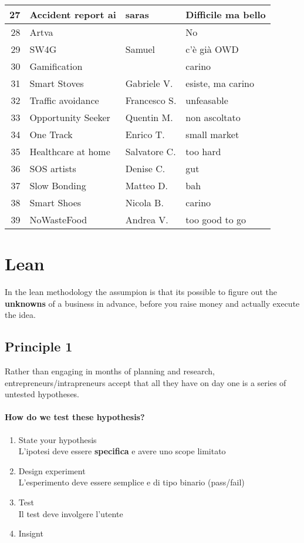 \documentclass{article}
\begin{document}
\begin{tabular}{r|l l l|}
    27& Accident report ai & saras & Difficile ma bello \\ \hline
    28& Artva & & No \\ \hline
    29& SW4G & Samuel & c'è già OWD \\ \hline
    30& Gamification & & carino \\ \hline
    31& Smart Stoves & Gabriele V. & esiste, ma carino \\ \hline
    32& Traffic avoidance & Francesco S. & unfeasable \\ \hline
    33& Opportunity Seeker & Quentin M. & non ascoltato \\ \hline
    34& One Track & Enrico T. & small market \\ \hline
    35& Healthcare at home & Salvatore C. & too hard \\ \hline
    36& SOS artists & Denise C. & gut \\ \hline
    37& Slow Bonding & Matteo D. & bah \\ \hline
    38& Smart Shoes & Nicola B. & carino \\ \hline
    39& NoWasteFood & Andrea V. & too good to go \\ \hline
\end{tabular}

\section{Lean}
In the lean methodology the assumpion is that its possible to figure out the \textbf{unknowns} of a business in advance, before you raise money and actually execute the idea.

\subsection{Principle 1}
Rather than engaging in months of planning and research, entrepreneurs/intrapreneurs accept that all they have on day one is a series of untested hypotheses.

\paragraph{How do we test these hypothesis?}
\begin{enumerate}
    \item State your hypothesis \\
        L'ipotesi deve essere \textbf{specifica} e avere uno scope limitato
    \item Design experiment \\
        L'esperimento deve essere semplice e di tipo binario (pass/fail)
    \item Test \\
        Il test deve involgere l'utente
    \item Insignt
\end{enumerate}
\end{document}
